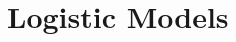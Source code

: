 \documentclass[9pt,letter,twoside,openright]{memoir}
\begin{document}
\section{Logistic Models}

\end{document}
